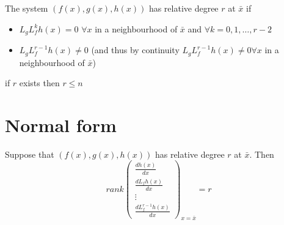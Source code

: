 \documentclass[english]{lectures}
\begin{document}
\begin{definition}
    The system $(f(x),g(x),h(x))$ has relative degree $r$ at $\bar{x}$ if
    \begin{itemize}
        \item $L_gL_f^kh(x)=0$ $\forall x$ in a  neighbourhood of $\bar{x}$ and $\forall k = 0,1,\dots,r-2$
        \item $L_gL_f^{r-1}h(x)\neq 0$ (and thus by continuity $L_gL_f^{r-1}h(x)\neq 0 \forall x$ in a neighbourhood of $\bar{x}$)
    \end{itemize}
\end{definition}

\begin{result}
    if $r$ exists then $r\leq n$
\end{result}
\section{Normal form}
\begin{result}
    Suppose that $(f(x),g(x),h(x))$ has relative degree $r$ at $\bar{x}$. Then
    \[
        rank \begin{pmatrix}
            \frac{dh(x)}{dx}\\\frac{dL_fh(x)}{dx}\\\vdots\\\frac{dL_f^{r-1}h(x)}{dx}
        \end{pmatrix}_{x=\bar{x}} = r
    \]
\end{result}
\end{document}
